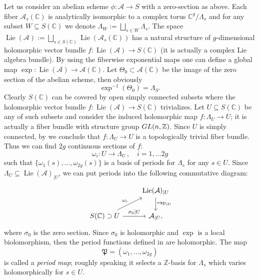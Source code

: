 \documentclass[10 pt,a4paper]{article}
\theoremstyle{plain}
\theoremstyle{definition}
\theoremstyle{named}
\newcommand{\cA}{\mathcal A}
\newcommand{\bC}{\mathbb C}
\newcommand{\fP}{\mathfrak P}
\newcommand{\bZ}{\mathbb Z}
\DeclareMathOperator{\Lie}{Lie}
\begin{document}
Let us consider an abelian scheme $\phi:\cA \to S$ with a zero-section as above. Each fiber $\cA_s(\bC)$ is analytically isomorphic  to  a complex torus $\bC^g/\Lambda_s$ and for any subset $W\subseteq S(\mathbb C)$ we denote $\Lambda_{W}:=\bigsqcup_{s\in W} \Lambda_s$. The space $\Lie(\cA):=\bigsqcup_{s\in S(\mathbb C)}\Lie(\mathcal A_s(\mathbb C))$ has a natural structure of $g$-dimensional holomorphic vector bundle $f\colon\Lie(\cA)\to S(\bC)$ (it is actually  a complex Lie algebra bundle). By using the fiberwise exponential maps one can define a global  map $\exp\colon \Lie(\cA)\to \cA(\mathbb C)$. Let $\Theta_0\subset\cA(\mathbb C)$ be the image of the zero section of the abelian scheme, then  obviously
\begin{equation}\label{periodSheafEq}
    \exp^{-1}(\Theta_0)=\Lambda_S.
\end{equation}
Clearly $S(\mathbb C)$ can be covered by open simply connected subsets where the holomorphic vector bundle $f\colon\Lie(\cA)\to S(\bC)$ trivializes. Let $U\subseteq S(\bC)$ be any of such subsets and consider the induced holomorphic map $f\colon \Lambda_U\to U$; it is actually a fiber bundle with structure group $\textnormal{GL}(n,\bZ)$.  Since $U$ is simply connected, by \cite[Lemma 4.7]{DK} we conclude that $f\colon \Lambda_U\to U$ is a  topologically trivial fiber bundle. Thus we can find $2g$ continuous sections of $f$:
\begin{equation}\label{periods}
    \mathcal \omega_i:U\to\Lambda_{U}\,,\quad i=1,\ldots 2g
\end{equation}
such that $\{\omega_1(s),\ldots,\omega_{2g}(s)\}$ is a basis of periods for $\Lambda_s$ for any $s\in U$. Since $\Lambda_U \subseteq \Lie(\cA)_{|U}$, we can put periods into the following commutative diagram:
$$
\begin{tikzcd}
     & \Lie(\cA)_{|U} \arrow{d}{\exp_{|U}}\\
    S(\bC) \supset U \arrow{r}{\sigma_0{|U}} \arrow{ur}{\omega_i} & \cA_{|U},
\end{tikzcd}
$$
where $\sigma_0$ is the zero section. Since $\sigma_0$ is holomorphic and $\exp$ is a local biolomorphism, then the period functions defined in  are holomorphic. The map
\begin{equation}\label{periodMap}
    \fP=(\omega_1,\ldots,\omega_{2g})
\end{equation}
is called a \emph{period map}; roughly speaking it selects a $\bZ$-basis for $\Lambda_s$ which varies holomorphically for $s\in U$. 
\end{document}
